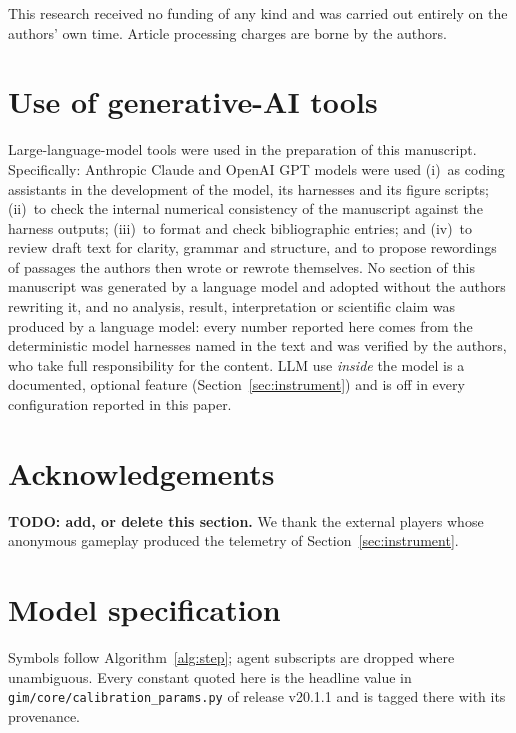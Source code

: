 \documentclass[12pt,a4paper]{article}
\renewcommand{\thefigure}{\arabic{figure}}
\newcommand{\Version}{v20.1.1}
\begin{document}
This research received no funding of any kind and was carried out entirely on the authors' own
time. Article processing charges are borne by the authors.

\section*{Use of generative-AI tools}

Large-language-model tools were used in the preparation of this manuscript. Specifically:
Anthropic Claude and OpenAI GPT models were used (i)~as coding assistants in the development of
the model, its harnesses and its figure scripts; (ii)~to check the internal numerical
consistency of the manuscript against the harness outputs; (iii)~to format and check
bibliographic entries; and (iv)~to review draft text for clarity, grammar and structure, and to
propose rewordings of passages the authors then wrote or rewrote themselves. No section of this
manuscript was generated by a language model and adopted without the authors rewriting it, and
no analysis, result, interpretation or scientific claim was produced by a language model: every
number reported here comes from the deterministic model harnesses named in the text and was
verified by the authors, who take full responsibility for the content. LLM use \emph{inside}
the model is a documented, optional feature (Section~\ref{sec:instrument}) and is off in every
configuration reported in this paper.

\section*{Acknowledgements}

\textbf{TODO: add, or delete this section.} We thank the external players whose anonymous
gameplay produced the telemetry of Section~\ref{sec:instrument}.

\clearpage
\appendix
\renewcommand{\theequation}{A\arabic{equation}}
\renewcommand{\thetable}{A\arabic{table}}
\renewcommand{\thefigure}{A\arabic{figure}}
\setcounter{equation}{0}\setcounter{table}{0}\setcounter{figure}{0}

\section{Model specification}
\label{app:spec}

Symbols follow Algorithm~\ref{alg:step}; agent subscripts are dropped where unambiguous. Every
constant quoted here is the headline value in \texttt{gim/core/calibration\_params.py} of
release \Version{} and is tagged there with its provenance.
\end{document}
